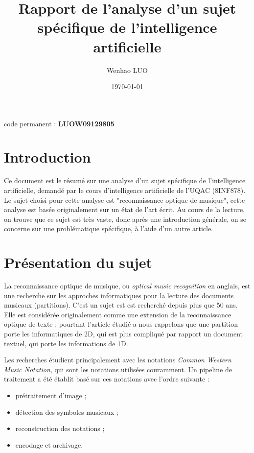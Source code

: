 \documentclass{article}
\author{Wenhao LUO}
\date{\today}
\title{Rapport de l'analyse d'un sujet spécifique de l'intelligence artificielle}
\begin{document}
\maketitle
\begin{center}
    code permanent : \textbf{LUOW09129805}
\end{center}
\newpage

\section{Introduction}
\par Ce document est le résumé sur une analyse d'un sujet spécifique de l'intelligence artificielle, demandé par le cours d'intelligence artificielle de l'UQAC (8INF878). Le sujet choisi pour cette analyse est "reconnaissance optique de musique", cette analyse est basée originalement sur un état de l'art écrit\cite{shatri2020optical}. Au cours de la lecture, on trouve que ce sujet est très vaste, donc après une introduction générale, on se concerne sur une problématique spécifique, à l'aide d'un autre article\cite{dos2009staff}.

\section{Présentation du sujet}
\par La reconnaissance optique de musique, ou \textit{optical music recognition} en anglais, est une recherche sur les approches informatiques pour la lecture des documents musicaux (partitions). C'est un sujet est est recherché depuis plus que 50 ans. Elle est considérée originalement comme une extension de la reconnaissance optique de texte ; pourtant l'article étudié a nous rappelons que une partition porte les informatiques de 2D, qui est plus compliqué par rapport un document textuel, qui porte les informations de 1D.

\par Les recherches étudient principalement avec les notations \textit{Common Western Music Notation}, qui sont les notations utilisées couramment. Un pipeline de traitement a été établit basé sur ces notations avec l'ordre suivante :
\begin{itemize}
    \item prétraitement d'image ;
    \item détection des symboles musicaux ;
    \item reconstruction des notations ;
    \item encodage et archivage.
\end{itemize}
\end{document}
